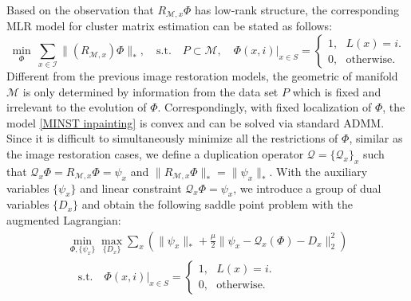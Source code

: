 \documentclass[letterpaper,10pt]{article}
\begin{document}
Based on the observation that $R_{\mathcal{M},x} \Phi$ has low-rank structure, the corresponding MLR model for cluster matrix estimation can be stated as follows:
\begin{equation}\label{MINST inpainting}
\min_{\Phi} ~\sum_{x \in \mathscr{I}} \|(R_{\mathcal{M},x}) \Phi \|_*, \quad \text{s.t.}\quad  P \subset \mathcal{M}, \quad \Phi(x,i)|_{x \in S} = \begin{cases}1, \ \ \ L(x) = i.\\0, \ \ \ \text{otherwise}. \end{cases}
\end{equation}
Different from the previous image restoration models, the geometric of manifold $\mathcal{M}$ is only determined by information from the data set $P$ which is fixed and irrelevant to the evolution of $\Phi$. Correspondingly, with fixed localization of $\Phi$, the model \eqref{MINST inpainting} is convex and can be solved via standard ADMM. Since it is difficult to simultaneously minimize all the restrictions of $\Phi$, similar as the image restoration cases, we define a duplication operator $\mathcal{Q} = \{\mathcal{Q}_x\}_x$ such that $\mathcal{Q}_x \Phi = R_{\mathcal{M},x}\Phi = \psi_x$ and $\|R_{\mathcal{M},x} \Phi \|_*=\|\psi_x\|_*$. With the auxiliary variables $\{\psi_x\}$ and linear constraint $\mathcal{Q}_x \Phi = \psi_x$, we introduce a group of dual variables $\{D_x\}$ and obtain the following saddle point problem with the augmented Lagrangian:
\begin{equation}\label{MINST inpainting aug Lag}
\begin{split}
\min_{\Phi, \{\psi_x\}}\max_{\{D_x\}} \sum_{x}\left( \|\psi_x\|_*  + \frac{\mu}{2} \|\psi_x - \mathcal{Q}_x (\Phi) -D_{x}\|_2^2 \right) \\ \quad \text{s.t.} \quad   \Phi(x,i)|_{x \in S} = \begin{cases}1, \ \ \ L(x) = i.\\0, \ \ \ \text{otherwise}. \end{cases}%
\end{split}
\end{equation}
\end{document}
